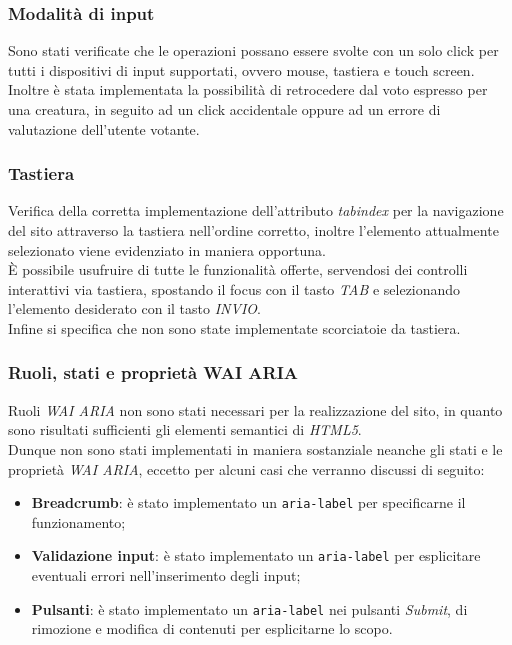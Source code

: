\subsubsection{Modalità di input}
\label{subsubsec:accessibility-input}
Sono stati verificate che le operazioni possano essere svolte con un solo click per tutti i dispositivi di input supportati, ovvero mouse, tastiera e touch screen. \\
Inoltre è stata implementata la possibilità di retrocedere dal voto espresso per una creatura, in seguito ad un click accidentale oppure ad un errore di valutazione dell'utente votante.

\subsubsection{Tastiera}
\label{subsubsec:accessibility-keyboard}
Verifica della corretta implementazione dell'attributo \textit{tabindex} per la navigazione del sito attraverso la tastiera nell'ordine corretto, inoltre l'elemento attualmente selezionato viene evidenziato in maniera opportuna. \\
È possibile usufruire di tutte le funzionalità offerte, servendosi dei controlli interattivi via tastiera, spostando il focus con il tasto \textit{TAB} e selezionando l'elemento desiderato con il tasto \textit{INVIO}. \\
Infine si specifica che non sono state implementate scorciatoie da tastiera.

\subsubsection{Ruoli, stati e proprietà WAI ARIA}
\label{subsubsec:accessibility-aria}

Ruoli \textit{WAI ARIA} non sono stati necessari per la realizzazione del sito, in quanto sono risultati sufficienti gli elementi semantici di \textit{HTML5}. \\
Dunque non sono stati implementati in maniera sostanziale neanche gli stati e le proprietà \textit{WAI ARIA}, eccetto per alcuni casi che verranno discussi di seguito:
\begin{itemize}
    \item \textbf{Breadcrumb}: è stato implementato un \texttt{aria-label} per specificarne il funzionamento;
    \item \textbf{Validazione input}: è stato implementato un \texttt{aria-label} per esplicitare eventuali errori nell'inserimento degli input;
    \item \textbf{Pulsanti}: è stato implementato un \texttt{aria-label} nei pulsanti \textit{Submit}, di rimozione e modifica di contenuti per esplicitarne lo scopo.
\end{itemize}

